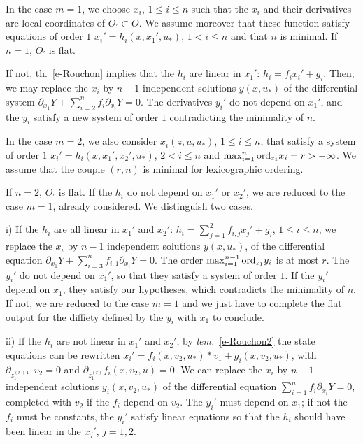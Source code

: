 \documentclass[A4paper, 12pt]{article}
\def\ord{{\rm ord}}
\def\textem#1{{\em #1\/}}
\begin{document}
In the case $m=1$, we choose
$x_{i}$, $1\le i\le n$ such that the $x_{i}$ and their derivatives are
local coordinates of $O_{\prime}\subset O$. We assume moreover that
these function satisfy equations of order $1$
$x_{i}'=h_{i}(x, x_{1}', u_{\ast})$, $1<i\le n$ and that $n$ is
minimal. If $n=1$, $O_{\prime}$ is flat. 

If not, th.~\ref{e-Rouchon} implies that the $h_{i}$ are linear in
$x_{1}'$: $h_{i}=f_{i}x_{i}'+g_{i}$. Then, we may replace the $x_{i}$
by $n-1$ independent solutions $y(x,u_{\ast})$ of the differential
system $\partial_{x_{1}} Y+\sum_{i=2}^{n}f_{i}\partial_{x_{i}}
Y=0$. The derivatives $y_{i}'$ do not depend on $x_{1}'$, and
the $y_{i}$ satisfy a new system of order $1$ contradicting the
minimality of $n$.
\smallskip

In the case $m=2$, we also consider $x_{i}(z,u,u_{\ast})$, $1\le i\le n$,
that satisfy a system of order $1$ $x_{i}'=h_{i}(x, x_{1}',
x_{2}',u_{\ast})$, $2<i\le n$ and 
$\max_{i=1}^{n}\ord_{z_{1}} x_{i}=r>-\infty$. We assume that the
couple $(r, n)$ is minimal for lexicographic ordering. 

If $n=2$, $O_{\prime}$ is flat. If the $h_{i}$ do not depend on
$x_{1}'$ or $x_{2}'$, we are reduced to the case $m=1$, already
considered. We distinguish two cases.
\smallskip


i) If the $h_{i}$ are all linear in $x_{1}'$ and $x_{2}'$: 
$h_{i}=\sum_{j=1}^{2}f_{i,j}x_{j}'+g_{i}$,
$1\le i\le n$,  we
replace the $x_{i}$ by $n-1$ independent solutions $y(x, u_{\ast})$,
of the differential equation $\partial_{x_{1}}
Y+\sum_{i=3}^{n}f_{i,1}\partial_{x_{i}} Y=0$. The order
$\max_{i=1}^{n-1}\ord_{z_{1}} y_{i}$ is at most $r$. The $y_{i}'$ do
not depend on $x_{1}'$, so that they satisfy a system of order
$1$. If the $y_{i}'$ depend on $x_{1}$, they satisfy our hypotheses,
which contradicts the minimality of $n$. If not, we are reduced to the
case $m=1$ and we just have to complete the flat output for the
diffiety defined by the $y_{i}$ with $x_{1}$ to conclude.
\smallskip

ii) If the $h_{i}$ are not linear in $x_{1}'$ and $x_{2}'$, by
\textem{lem.}~\ref{e-Rouchon2} the state equations can be rewritten
$x_{i}'=f_{i}(x,v_{2},u_{\ast})*v_{1}+g_{i}(x,v_{2},u_{\ast})$, with
$\partial_{z_{1}^{(r+1)}}v_{2}=0$ and
$\partial_{z_{1}^{(r)}}f_{i}(x,v_{2},u)=0$.
We can replace the $x_{i}$ by 
$n-1$ independent solutions $y_{i}(x,v_{2},u_{\ast})$  of the
differential equation $\sum_{i=1}^{n}f_{i}\partial_{x_{i}}Y=0$,
completed with $v_{2}$ if the $f_{i}$ depend on $v_{2}$. The
$y_{i}'$ must depend on $x_{1}$; if not the $f_{i}$ must be constants,
the $y_{i}'$ satisfy linear equations so that the $h_{i}$ should have been
linear in the $x_{j}'$, $j=1,2$.
\end{document}
